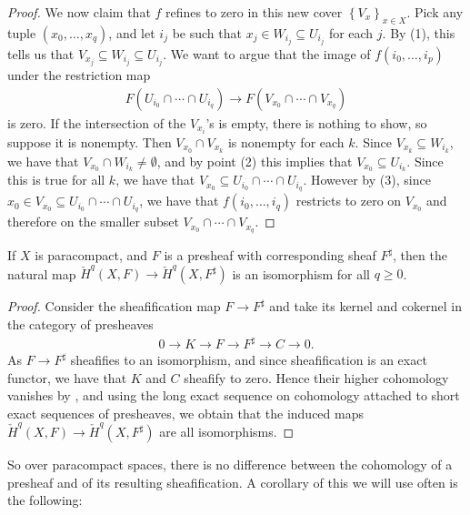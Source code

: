 \documentclass[11pt]{book}
\begin{document}
\begin{proof}
We now claim that $f$ refines to zero in this new cover $\left\{ V_x \right\}_{x\in X}$. Pick any tuple $(x_0, \ldots, x_q)$, and let $i_j$ be such that $x_j \in W_{i_j} \subseteq U_{i_j}$ for each $j$. By (1), this tells us that $V_{x_j} \subseteq W_{i_j} \subseteq U_{i_j}$. We want to argue that the image of $f(i_0, \ldots, i_p)$ under the restriction map
\begin{align*}
    F(U_{i_0} \cap \cdots \cap U_{i_q}) \to F(V_{x_0}\cap \cdots \cap V_{x_q})
\end{align*}
is zero. If the intersection of the $V_{x_i}$'s is empty, there is nothing to show, so suppose it is nonempty. Then $V_{x_0}\cap V_{x_k}$ is nonempty for each $k$. Since $V_{x_k} \subseteq W_{i_k}$, we have that $V_{x_0} \cap W_{i_k} \ne \emptyset$, and by point (2) this implies that $V_{x_0} \subseteq U_{i_k}$. Since this is true for all $k$, we have that $V_{x_0} \subseteq U_{i_0} \cap \cdots \cap U_{i_q}$. However by (3), since $x_0 \in V_{x_0}\subseteq U_{i_0} \cap \cdots \cap U_{i_q}$, we have that $f(i_0, \ldots, i_q)$ restricts to zero on $V_{x_0}$ and therefore on the smaller subset $V_{x_0} \cap \cdots \cap V_{x_q}$.
\end{proof}


\begin{theorem}\label{thm:paracompact-space-Cech-cohomology-of-sheafification} 
If $X$ is paracompact, and $F$ is a presheaf with corresponding sheaf $F^\sharp$, then the natural map $\check{H}^q(X,F) \to \check{H}^q(X,F^\sharp)$ is an isomorphism for all $q\ge0$.
\end{theorem}
\begin{proof} Consider the sheafification map $F \to F^\sharp$ and take its kernel and cokernel in the category of presheaves
\begin{align*}
    0 \to K \to F \to F^\sharp \to C \to 0.
\end{align*}
As $F \to F^\sharp$ sheafifies to an isomorphism, and since sheafification is an exact functor, we have that $K$ and $C$ sheafify to zero. Hence their higher cohomology vanishes by , and using the long exact sequence on cohomology attached to short exact sequences of presheaves, we obtain that the induced maps $\check{H}^q(X,F) \to \check{H}^q(X,F^\sharp)$ are all isomorphisms.
\end{proof}

So over paracompact spaces, there is no difference between the cohomology of a presheaf and of its resulting sheafification. A corollary of this we will use often is the following:
\end{document}
